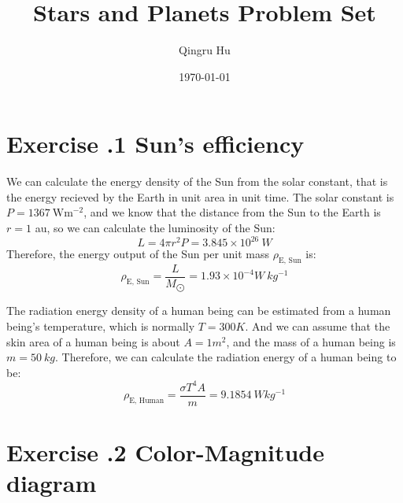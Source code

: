 \documentclass[a4paper,12pt]{article}
\title{\textbf{Stars and Planets Problem Set \uppercase\expandafter{\romannumeral1}}}
\author{Qingru Hu}
\date{\today}
\begin{document}
\maketitle

\section*{\textbf{Exercise \uppercase\expandafter{}.1 Sun's efficiency}}
We can calculate the energy density of the Sun from the 
solar constant, that is the energy recieved by the Earth in 
unit area in unit time. 
The solar constant is $P = 1367 \ \text{W} \text{m}^{-2}$, and we know that 
the distance from the Sun to the Earth is $r = 1$ au, so we 
can calculate the luminosity of the Sun:
\begin{equation}
    L = 4 \pi r^2 P = 3.845 \times 10^{26} \ W
\end{equation}
Therefore, the energy output of the Sun per unit mass $\rho_\text{E, Sun}$ is:
\begin{equation}
    \rho_\text{E, Sun} = \frac{L}{M_{\bigodot}} = 1.93 \times 10^{-4} W \ kg^{-1}
\end{equation}

The radiation energy density of a human being can be 
estimated from a human being's temperature, which is normally $T = 300K$.
And we can assume that the skin area of a human being is about $A=1m^2$, and 
the mass of a human being is $m = 50 \ kg$.
Therefore, we can calculate the radiation energy of a human being to be:
\begin{equation}
    \rho_\text{E, Human} = \frac{\sigma T^4 A}{m} = 9.1854 \ W kg^{-1}
\end{equation}

\section*{\textbf{Exercise \uppercase\expandafter{}.2 Color-Magnitude diagram}}
\end{document}
